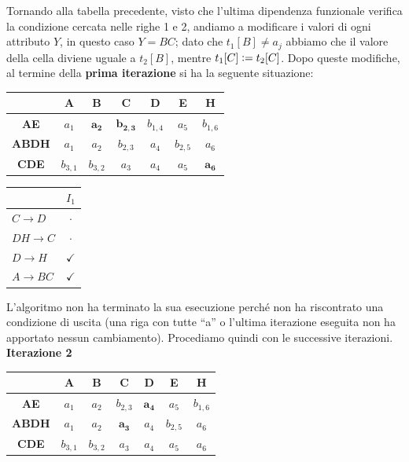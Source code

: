 \begin{exmp}
 Tornando alla tabella precedente, visto che l'ultima dipendenza funzionale verifica la condizione cercata nelle righe 1 e 2,
 andiamo a modificare i valori di ogni attributo $Y$, in questo caso $Y= BC$; dato che $t_1[B]\not= a_j$ abbiamo che il valore
 della cella diviene uguale a $t_2[B]$, mentre $t_1[C]\vcentcolon= t_2[C]$. Dopo queste modifiche, al termine della \textbf{prima 
 iterazione} si ha la seguente situazione:
 \begin{multicols}{2}
   \begin{center}
  \begin{tabular}{c|c|c|c|c|c|c}
    & \textbf{A} & \textbf{B} &\textbf{C}&\textbf{D}&\textbf{E}&\textbf{H}\\
   \hline
   \textbf{AE} & $a_1$ & $\mathbf{a_2}$ & $\mathbf{b_{2,3}}$ & $b_{1,4}$ & $a_5$ & $b_{1,6}$\\
   \hline
   \textbf{ABDH}& $a_1$ & $a_2$ & $b_{2,3}$ & $a_4$ & $b_{2,5}$ & $a_6$\\
   \hline
   \textbf{CDE} & $b_{3,1}$ & $b_{3,2}$ & $a_3$ & $a_4$ & $a_5$ & $\mathbf{a_6}$\\
  \end{tabular}
 \end{center}
 
  \begin{center}
  \begin{tabular}{l|c}
   & $I_1$\\
   \hline
   $C\rightarrow D$ & $\cdot$\\
   $DH\rightarrow C$& $\cdot$\\
   $D \rightarrow H$ & $\checkmark$\\
   $A \rightarrow BC$ & $\checkmark$\\
  \end{tabular}
 \end{center}
 \end{multicols}
L'algoritmo non ha terminato la sua esecuzione perché non ha riscontrato una condizione di uscita (una riga con tutte ``a'' o
l'ultima iterazione eseguita non ha apportato nessun cambiamento). Procediamo quindi con le successive iterazioni.\\

\textbf{Iterazione 2}
 \begin{multicols}{2}
   \begin{center}
  \begin{tabular}{c|c|c|c|c|c|c}
    & \textbf{A} & \textbf{B} &\textbf{C}&\textbf{D}&\textbf{E}&\textbf{H}\\
   \hline
   \textbf{AE} & $a_1$ & $a_2$ & $b_{2,3}$ & $\mathbf{a_4}$ & $a_5$ & $b_{1,6}$\\
   \hline
   \textbf{ABDH}& $a_1$ & $a_2$ & $\mathbf{a_3}$ & $a_4$ & $b_{2,5}$ & $a_6$\\
   \hline
   \textbf{CDE} & $b_{3,1}$ & $b_{3,2}$ & $a_3$ & $a_4$ & $a_5$ & $a_6$
  \end{tabular}
 \end{center}
 

\end{multicols}
\end{exmp}
